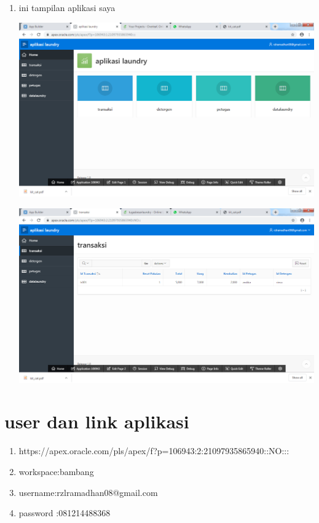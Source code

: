 \documentclass{article}
\begin{document}
\begin{enumerate}
\item ini tampilan aplikasi saya 
    \begin{center}
         \centering
            \includegraphics[scale=0.27]{gambar/Capture17.PNG}
        \caption{}
        \label{excel}
    \end{center} 
    
    \begin{center}
         \centering
            \includegraphics[scale=0.27]{gambar/Capture18.PNG}
        \caption{}
        \label{excel}
    \end{center} 
    
\end{enumerate}

\section{user dan link aplikasi}
\begin{enumerate}
\item https://apex.oracle.com/pls/apex/f?p=106943:2:21097935865940::NO:::
\item workspace:bambang
\item username:rzlramadhan08@gmail.com
\item password :081214488368
\end{enumerate}
\end{document}
